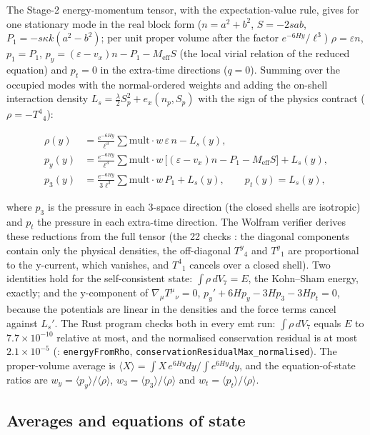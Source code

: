 \documentclass[11pt]{article}
\begin{document}
The Stage-2 energy-momentum tensor, with the expectation-value rule, gives for one stationary mode in the real block form ($n=a^2+b^2$, $S=-2sab$, $P_1=-s\kappa k(a^2-b^2)$; per unit proper volume after the factor $e^{-6Hy}/\ell^3$) $\rho=\varepsilon n$, $p_1=P_1$, $p_y=(\varepsilon-v_x)n-P_1-M_{\mathrm{eff}}S$ (the local virial relation of the reduced equation) and $p_t=0$ in the extra-time directions ($q=0$). Summing over the occupied modes with the normal-ordered weights and adding the on-shell interaction density $L_s=\tfrac\lambda2S_p^2+e_x(n_p,S_p)$ with the sign of the physics contract ($\rho=-T^4{}_4$):

\[
\begin{aligned}
\rho(y)&=\frac{e^{-6Hy}}{\ell^3}\sum\mathrm{mult}\cdot w\,\varepsilon\,n-L_s(y),\\
p_y(y)&=\frac{e^{-6Hy}}{\ell^3}\sum\mathrm{mult}\cdot w\,\bigl[(\varepsilon-v_x)n-P_1-M_{\mathrm{eff}}S\bigr]+L_s(y),\\
p_3(y)&=\frac{e^{-6Hy}}{3\ell^3}\sum\mathrm{mult}\cdot w\,P_1+L_s(y),\qquad p_t(y)=L_s(y),
\end{aligned}
\]

where $p_3$ is the pressure in each 3-space direction (the closed shells are isotropic) and $p_t$ the pressure in each extra-time direction. The Wolfram verifier derives these reductions from the full tensor (the 22 checks \texttt{}: the diagonal components contain only the physical densities, the off-diagonal $T^y{}_4$ and $T^y{}_1$ are proportional to the y-current, which vanishes, and $T^4{}_1$ cancels over a closed shell). Two identities hold for the self-consistent state: $\int\rho\,dV_7=E$, the Kohn--Sham energy, exactly; and the y-component of $\nabla_\mu T^\mu{}_\nu=0$, $p_y'+6Hp_y-3Hp_3-3Hp_t=0$, because the potentials are linear in the densities and the force terms cancel against $L_s'$. The Rust program checks both in every emt run: $\int\rho\,dV_7$ equals $E$ to $7.7\times10^{-10}$ relative at most, and the normalised conservation residual is at most $2.1\times10^{-5}$ (\texttt{}: \texttt{energyFr\allowbreak{}omRho}, \texttt{conserva\allowbreak{}tionResi\allowbreak{}dualMax\_\allowbreak{}normalis\allowbreak{}ed}). The proper-volume average is $\langle X\rangle=\int X\,e^{6Hy}dy\big/\int e^{6Hy}dy$, and the equation-of-state ratios are $w_y=\langle p_y\rangle/\langle\rho\rangle$, $w_3=\langle p_3\rangle/\langle\rho\rangle$ and $w_t=\langle p_t\rangle/\langle\rho\rangle$.

\subsection{Averages and equations of state}
\end{document}
